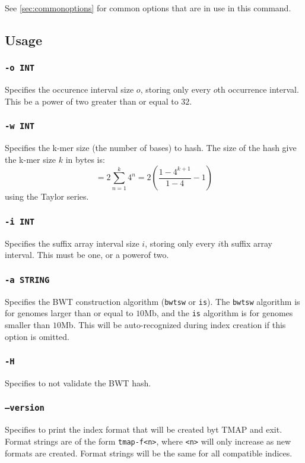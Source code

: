 \documentclass[a4paper,12pt]{book}
\newcommand{\TT}[1]{{\tt #1}} %
\begin{document}
See \autoref{sec:commonoptions} for common options that are in use in this command.

\subsection{Usage}

\subsubsection{\TT{-o INT}}
Specifies the occurence interval size $o$, storing only every $o$th occurrence interval.
This be a power of two greater than or equal to $32$.

\subsubsection{\TT{-w INT}}
Specifies the k-mer size (the number of bases) to hash.
The size of the hash give the k-mer size $k$ in bytes is:
\[
= 2 \sum_{n=1}^{k} 4^{n}
= 2 \left(\frac{1 - 4^{k+1}}{1-4} - 1\right)
\]
using the Taylor series.

\subsubsection{\TT{-i INT}}
Specifies the suffix array interval size $i$, storing only every $i$th suffix array interval.
This must be one, or a powerof two.

\subsubsection{\TT{-a STRING}}
Specifies the BWT construction algorithm (\TT{bwtsw} or \TT{is}).
The \TT{bwtsw} algorithm is for genomes larger than or equal to $10$Mb, and the \TT{is} algorithm is for genomes smaller than $10$Mb.
This will be auto-recognized during index creation if this option is omitted.

\subsubsection{\TT{-H}}
Specifies to not validate the BWT hash.

\subsubsection{\TT{--version}}
Specifies to print the index format that will be created byt TMAP and exit.
Format strings are of the form \TT{tmap-f<n>}, where \TT{<n>} will only increase as new formats are created.
Format strings will be the same for all compatible indices.
\end{document}
